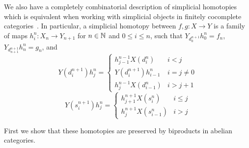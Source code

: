 We also have a completely combinatorial description of simplicial homotopies which is equivalent when working with simplicial objects in finitely cocomplete categories~\cite{weibel_1994}. In particular, a simplicial homotopy between $f,g:X\to Y$ is a family of maps $h_i^n:X_n\to Y_{n+1}$ for $n \in \mathbb N$ and $0\leq i \leq n$, such that $Y_{d_0^{n+1}}h^n_0 = f_n$, $Y_{d_{n+1}^{n+1}}h_n^n=g_n$, and 
\begin{equation*}
    Y(d_i^{n+1})h_j^n = \left\{\begin{array}{cc} h_{j-1}^{n-1}X(d_i^n) & i < j \\ Y(d_i^{n+1})h_{i-1}^n & i = j \neq 0 \\ h_j^{n-1}X(d_{i-1}^n) & i > j+1 \end{array}\right.
\end{equation*}
\begin{equation*}
    Y(s_i^{n+1})h_j^n = \left\{\begin{array}{cc} h_{j+1}^{n+1}X(s_i^n) & i \leq j \\ h_j^{n+1}X(s_{i-1}^n) & i > j \end{array}\right.
\end{equation*}


First we show that these homotopies are preserved by biproducts in abelian categories.


